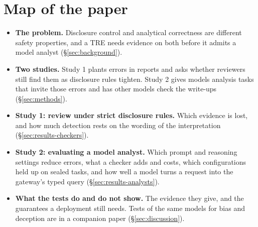 \section*{Map of the paper}
\begin{itemize}
\item \textbf{The problem.} Disclosure control and analytical correctness are different safety properties, and a TRE needs evidence on both before it admits a model analyst (\S\ref{sec:background}).
\item \textbf{Two studies.} Study 1 plants errors in reports and asks whether reviewers still find them as disclosure rules tighten. Study 2 gives models analysis tasks that invite those errors and has other models check the write-ups (\S\ref{sec:methods}).
\item \textbf{Study 1: review under strict disclosure rules.} Which evidence is lost, and how much detection rests on the wording of the interpretation (\S\ref{sec:results-checkers}).
\item \textbf{Study 2: evaluating a model analyst.} Which prompt and reasoning settings reduce errors, what a checker adds and costs, which configurations held up on sealed tasks, and how well a model turns a request into the gateway's typed query (\S\ref{sec:results-analysts}).
\item \textbf{What the tests do and do not show.} The evidence they give, and the guarantees a deployment still needs. Tests of the same models for bias and deception are in a companion paper (\S\ref{sec:discussion}).
\end{itemize}

